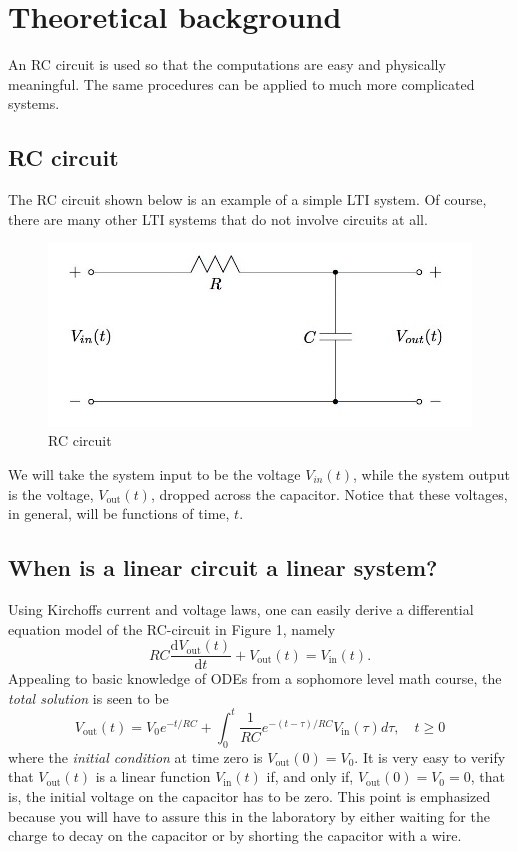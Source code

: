 \documentclass[a4paper]{article}
\begin{document}
\section{Theoretical background}
An RC circuit is used so that the computations are easy and physically meaningful. The same procedures can be applied to much more complicated systems.
\subsection{RC circuit}
The RC circuit shown below is an example of a simple LTI system. Of course, there are many other LTI systems that do not involve circuits at all.
\begin{figure}[H]
	\centering
	\includegraphics[width=0.7\linewidth]{1.jpg}
	\caption{RC circuit}
\end{figure}
We will take the system input to be the voltage $V_{in}(t)$, while the system output is the voltage, $V_\text{out}(t)$, dropped across the capacitor. Notice that these voltages, in general, will be functions of time, $t$.
\subsection{When is a linear circuit a linear system?}
Using Kirchoffs current and voltage laws, one can easily derive a differential equation model of the RC-circuit in Figure 1, namely
\begin{equation}
	RC\frac{\mathrm{d}V_\text{out}(t)}{\mathrm{d}t}+V_\text{out}(t)=V_\text{in}(t).
\end{equation}
Appealing to basic knowledge of ODEs from a sophomore level math course, the \textit{total solution} is seen to be
\begin{equation}
	V_\text{out}(t)=V_0e^{-t/RC}+\int_0^t\frac{1}{RC}e^{-(t-\tau)/RC}V_\text{in}(\tau)d\tau,\quad t\geqslant0
\end{equation}
where the \textit{initial condition} at time zero is $V_\text{out}(0)=V_0$. It is very easy to verify that $V_\text{out}(t)$ is a linear function $V_\text{in}(t)$ if, and only if, $V_\text{out}(0)=V_0=0$, that is, the initial voltage on the capacitor has to be zero. This point is emphasized because you will have to assure this in the laboratory by either waiting for the charge to decay on the capacitor or by shorting the capacitor with a wire.
\end{document}
